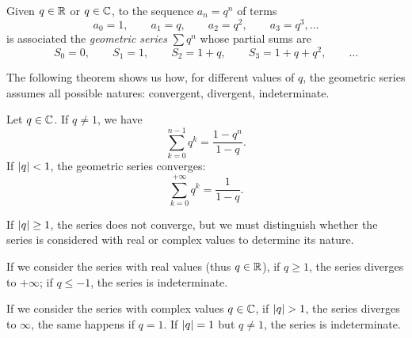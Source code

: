 \begin{example}
Given $q \in {\mathbb R}$ or $q\in {\mathbb C}$, to the sequence
$  a_n = q^n$
of terms
\[
  a_0 = 1,\qquad
  a_1 = q,\qquad
  a_2 = q^2,\qquad
  a_3 = q^3, \dots
\]
is associated the
\emph{geometric series}%
%
$\sum q^n$
whose partial sums are
\[
  S_0 = 0, \qquad
  S_1 = 1, \qquad
  S_2 = 1 + q, \qquad
  S_3 = 1 + q + q^2, \qquad
  \dots
\]
\end{example}

The following theorem shows us how, for different values of $q$, the geometric
series assumes all possible natures: convergent, divergent, indeterminate.

\begin{theorem}
\label{th:serie_geometrica}%
\mymark{***}%
%
%
Let $q\in {\mathbb C}$. If $q\neq 1$, we have
\[
 \sum_{k=0}^{n-1} q^k  = \frac{1-q^n}{1-q}.
\]
If ${\left|q\right|} < 1$, the geometric series converges:
\[
 \sum_{k=0}^{+\infty} q^k = \frac{1}{1-q}.
\]

If ${\left|q\right|}\ge 1$, the series does not converge, but we must distinguish whether
the series is considered with real or complex values to determine its nature.

If we consider the series with real values (thus $q\in {\mathbb R}$), if $q\ge 1$, the
series diverges to $+\infty$; if $q\le -1$, the series is indeterminate.

If we consider the series with complex values $q\in {\mathbb C}$, if ${\left|q\right|}>1$, the
series diverges to $\infty$, the same happens if $q=1$. If ${\left|q\right|}=1$ but
$q\neq 1$, the series is indeterminate.
\end{theorem}
%
